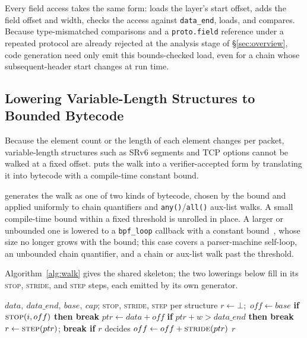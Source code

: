 Every field access takes the same form: \kunai loads the layer's start
offset, adds the field offset and width, checks the access against
\texttt{data\_end}, loads, and compares. Because type-mismatched
comparisons and a \texttt{proto.field} reference under a repeated
protocol are already rejected at the analysis stage of
\S\ref{sec:overview}, code generation need only emit this bounds-checked
load, even for a chain whose subsequent-header start changes at run time.

\subsection{Lowering Variable-Length Structures to Bounded Bytecode}
\label{sec:bounded}

Because the element count or the length of each element changes per
packet, variable-length structures such as SRv6 segments and TCP
options cannot be walked at a fixed offset. \kunai puts the walk into a
verifier-accepted form by translating it into bytecode with a
compile-time constant bound.

\kunai generates the walk as one of two kinds of bytecode, chosen by
the bound and applied uniformly to chain quantifiers and
\texttt{any()}/\texttt{all()} aux-list walks. A small compile-time bound
within a fixed threshold is unrolled in place. A larger or unbounded one
is lowered to a
\texttt{bpf\_loop} callback with a constant
bound~\cite{bpf_loop_helper}, whose size no longer grows with the
bound; this case covers a parser-machine self-loop, an unbounded chain
quantifier, and a chain or aux-list walk past the threshold.

Algorithm~\ref{alg:walk} gives the shared skeleton; the two lowerings
below fill in its \textsc{stop}, \textsc{stride}, and \textsc{step}
steps, each emitted by its own generator.

\begin{algorithm}[htbp]
  \caption{Bounded walk skeleton; \textsc{stop}, \textsc{stride}, and
  \textsc{step} are filled in per structure.}
  \label{alg:walk}
  \begin{algorithmic}[1]
    \Require $data,\ data\_end,\ base,\ cap$; \textsc{stop}, \textsc{stride}, \textsc{step} per structure
    \State $r \gets \bot$;\ $off \gets base$
     
      \State \textbf{if} $\textsc{stop}(i, off)$ \textbf{then break} 
      \State $ptr \gets data + off$
      \State \textbf{if} $ptr + w > data\_end$ \textbf{then break} 
      \State $r \gets \textsc{step}(ptr)$; \textbf{break if} $r$ decides 
      \State $off \gets off + \textsc{stride}(ptr)$ 
    \EndFor
    \State \Return $r$
  \end{algorithmic}
\end{algorithm}

